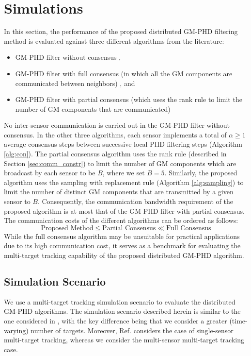 \section{Simulations}
\label{sec:simulation}
In this section, the performance of the proposed distributed GM-PHD filtering method is evaluated against three different algorithms from the literature:
\begin{itemize}
\item GM-PHD filter without consensus \cite{vo2006gmphd}, 
\item GM-PHD filter with full consensus (in which all the GM components are communicated between neighbors) \cite{battistelli2020differentFOVs}, and 
\item GM-PHD filter with partial consensus (which uses the rank rule to limit the number of GM components that are communicated) \cite{li2018partial}
\end{itemize}

No inter-sensor communication is carried out in the GM-PHD filter without consensus. In the other three algorithms, each sensor implements a total of $\alpha \geq 1$ average consensus steps between successive local PHD filtering steps (Algorithm \ref{alg:con}). The partial consensus algorithm uses the rank rule (described in Section \ref{sec:comm_constr}) to limit the number of GM components which are broadcast by each sensor to be $B$, where we set $B=5$.
Similarly, the proposed algorithm uses the sampling with replacement rule (Algorithm \ref{alg:sampling}) to limit the number of distinct GM components that are transmitted by a given sensor to $B$. Consequently, the communication bandwidth requirement of the proposed algorithm is at most that of the GM-PHD filter with partial consensus. The communication costs of the different algorithms can be ordered as follows:
\begin{equation*}
\text{Proposed Method} \leq \text{Partial Consensus} \ll \text{Full Consensus}
\end{equation*}
\noindent
While the full consensus algorithm may be unsuitable for practical applications due to its high communication cost, it serves as a benchmark for evaluating the multi-target tracking capability of the proposed distributed GM-PHD algorithm.

\subsection{Simulation Scenario}
We use a multi-target tracking simulation scenario to evaluate the distributed GM-PHD algorithms. The simulation scenario described herein is similar to the one considered in \cite{vo2006gmphd}, with the key difference being that we consider a greater (time-varying) number of targets. Moreover, Ref. \cite{vo2006gmphd} considers the case of single-sensor multi-target tracking, whereas we consider the multi-sensor multi-target tracking case.

